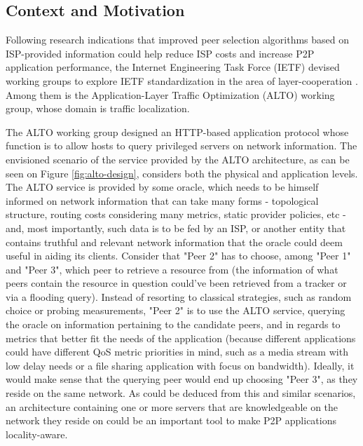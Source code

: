 \subsection{Context and Motivation}


    Following research indications that improved peer selection algorithms based on ISP-provided information could help reduce ISP costs and increase P2P application performance, the Internet Engineering Task Force (IETF) devised working groups to explore IETF standardization in the area of layer-cooperation \cite{seedorf2009}.
    Among them is the Application-Layer Traffic Optimization (ALTO) working group, whose domain is traffic localization.

    The ALTO working group designed an HTTP-based application protocol whose function is to allow hosts to query privileged servers on network information.
    The envisioned scenario of the service provided by the ALTO architecture, as can be seen on Figure \ref{fig:alto-design}, considers both the physical and application levels.
    The ALTO service is provided by some oracle, which needs to be himself informed on network information that can take many forms - topological structure, routing costs considering many metrics, static provider policies, etc - and, most importantly, such data is to be fed by an ISP, or another entity that contains truthful and relevant network information that the oracle could deem useful in aiding its clients.
    Consider that "Peer 2" has to choose, among "Peer 1" and "Peer 3", which peer to retrieve a resource from (the information of what peers contain the resource in question could've been retrieved from a tracker or via a flooding query).
    Instead of resorting to classical strategies, such as random choice or probing measurements, "Peer 2" is to use the ALTO service, querying the oracle on information pertaining to the candidate peers, and in regards to metrics that better fit the needs of the application (because different applications could have different QoS metric priorities in mind, such as a media stream with low delay needs or a file sharing application with focus on bandwidth).
    Ideally, it would make sense that the querying peer would end up choosing "Peer 3", as they reside on the same network.
    As could be deduced from this and similar scenarios, an architecture containing one or more servers that are knowledgeable on the network they reside on could be an important tool to make P2P applications locality-aware.

